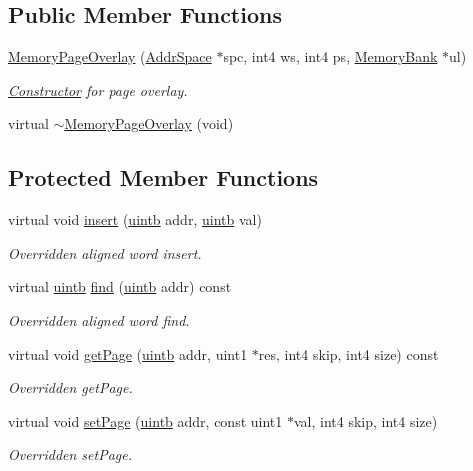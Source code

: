 \subsection*{Public Member Functions}
\begin{DoxyCompactItemize}
\item 
\mbox{\hyperlink{class_memory_page_overlay_a6c428c147305c5233d570fcfe74d747d}{Memory\+Page\+Overlay}} (\mbox{\hyperlink{class_addr_space}{Addr\+Space}} $\ast$spc, int4 ws, int4 ps, \mbox{\hyperlink{class_memory_bank}{Memory\+Bank}} $\ast$ul)
\begin{DoxyCompactList}\small\item\em \mbox{\hyperlink{class_constructor}{Constructor}} for page overlay. \end{DoxyCompactList}\item 
virtual \mbox{\hyperlink{class_memory_page_overlay_ae1c65452300361f917041a4cbd4eea8d}{$\sim$\+Memory\+Page\+Overlay}} (void)
\end{DoxyCompactItemize}
\subsection*{Protected Member Functions}
\begin{DoxyCompactItemize}
\item 
virtual void \mbox{\hyperlink{class_memory_page_overlay_a4dad83693ae5fe82459e9bdcb3f2415f}{insert}} (\mbox{\hyperlink{types_8h_a2db313c5d32a12b01d26ac9b3bca178f}{uintb}} addr, \mbox{\hyperlink{types_8h_a2db313c5d32a12b01d26ac9b3bca178f}{uintb}} val)
\begin{DoxyCompactList}\small\item\em Overridden aligned word insert. \end{DoxyCompactList}\item 
virtual \mbox{\hyperlink{types_8h_a2db313c5d32a12b01d26ac9b3bca178f}{uintb}} \mbox{\hyperlink{class_memory_page_overlay_a7ba248277eadf04ca7895dea1e614148}{find}} (\mbox{\hyperlink{types_8h_a2db313c5d32a12b01d26ac9b3bca178f}{uintb}} addr) const
\begin{DoxyCompactList}\small\item\em Overridden aligned word find. \end{DoxyCompactList}\item 
virtual void \mbox{\hyperlink{class_memory_page_overlay_a0b502920d00bee935fdd15a2e2d823f2}{get\+Page}} (\mbox{\hyperlink{types_8h_a2db313c5d32a12b01d26ac9b3bca178f}{uintb}} addr, uint1 $\ast$res, int4 skip, int4 size) const
\begin{DoxyCompactList}\small\item\em Overridden get\+Page. \end{DoxyCompactList}\item 
virtual void \mbox{\hyperlink{class_memory_page_overlay_a1d713334ec06e47cfdfcf76f0649eb71}{set\+Page}} (\mbox{\hyperlink{types_8h_a2db313c5d32a12b01d26ac9b3bca178f}{uintb}} addr, const uint1 $\ast$val, int4 skip, int4 size)
\begin{DoxyCompactList}\small\item\em Overridden set\+Page. \end{DoxyCompactList}\end{DoxyCompactItemize}
